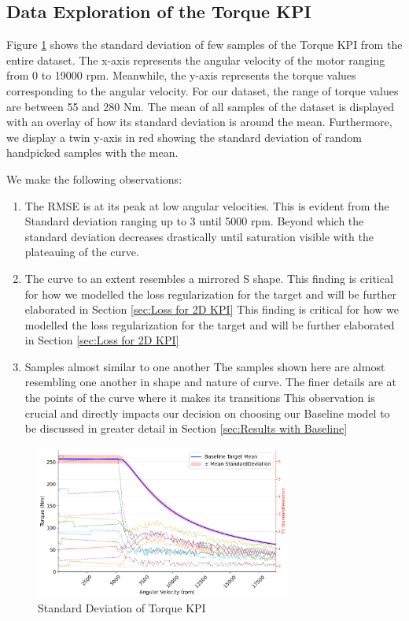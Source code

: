 \documentclass{report} %
\begin{document}
\subsection{Data Exploration of the Torque \ac{KPI}}\label{subsec:Deep Dive into 2D KPI}
Figure \ref{fig:Standard Deviation of 2D KPI} shows the standard deviation of few samples of the Torque \ac{KPI} from the entire dataset.
The x-axis represents the angular velocity of the motor ranging from 0 to 19000 rpm. Meanwhile, the y-axis represents the torque values corresponding to the angular velocity.
For our dataset, the range of torque values are between 55 and 280 Nm. 
The mean of all samples of the dataset is displayed with an overlay of how its standard deviation is around the mean.
Furthermore, we display a twin y-axis in red showing the standard deviation of random handpicked samples with the mean.

We make the following observations:
\begin{enumerate}
    \item The \ac{RMSE} is at its peak at low angular velocities.
    This is evident from the Standard deviation ranging up to 3 until 5000 rpm. Beyond which the standard deviation decreases drastically until 
    saturation visible with the plateauing of the curve.
    \item The curve to an extent resembles a mirrored S shape.
    This finding is critical for how we modelled the loss regularization for the target and will be further elaborated in Section \ref{sec:Loss for 2D KPI}
    This finding is critical for how we modelled the loss regularization for the target and will be further elaborated in Section \ref{sec:Loss for 2D KPI}
    \item Samples almost similar to one another
    The samples shown here are almost resembling one another in shape and nature of curve. The finer details are at the points of the curve where it makes its transitions 
    This observation is crucial and directly impacts our  decision on choosing our Baseline model to be discussed in greater detail in Section \ref{sec:Results with Baseline}
\end{enumerate}

\begin{figure}[H]
    \centering
    \includegraphics[width=0.75\textwidth]{./ReportImages/StandardDeviation_Baseline_y1.png} 
    \caption{Standard Deviation of Torque KPI} 
    \label{fig:Standard Deviation of 2D KPI}
\end{figure}
\end{document}
